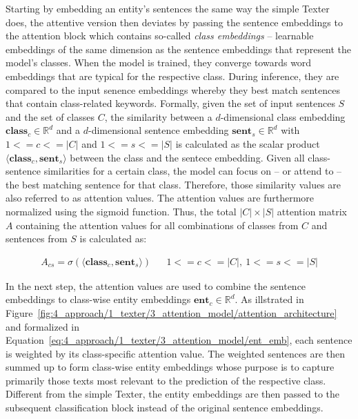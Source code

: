 Starting by embedding an entity's sentences the same way the simple Texter does, the attentive version then deviates by passing the sentence embeddings to the attention block which contains so-called \emph{class embeddings} -- learnable embeddings of the same dimension as the sentence embeddings that represent the model's classes. When the model is trained, they converge towards word embeddings that are typical for the respective class. During inference, they are compared to the input senence embeddings whereby they best match sentences that contain class-related keywords. Formally, given the set of input sentences $S$ and the set of classes $C$, the similarity between a $d$-dimensional class embedding $\textbf{class}_c \in \mathbb{R}^d$ and a $d$-dimensional sentence embedding $\textbf{sent}_s \in \mathbb{R}^d$ with $1 <= c <= |C|$ and $1 <= s <= |S|$ is calculated as the scalar product $\langle \textbf{class}_c, \textbf{sent}_s \rangle$ between the class and the sentece embedding. Given all class-sentence similarities for a certain class, the model can focus on -- or attend to -- the best matching sentence for that class. Therefore, those similarity values are also referred to as attention values. The attention values are furthermore normalized using the sigmoid function. Thus, the total $|C| \times |S|$ attention matrix $A$ containing the attention values for all combinations of classes from $C$ and sentences from $S$ is calculated as:

\begin{align}
    A_{cs} = \sigma(\langle \textbf{class}_c , \textbf{sent}_s \rangle) && 1 <= c <= |C|,~1 <= s <= |S|
    \label{eq:4_approach/1_texter/3_attention_model/attention_matrix}
\end{align}

In the next step, the attention values are used to combine the sentence embeddings to class-wise entity embeddings $\textbf{ent}_c \in \mathbb{R}^d$. As illstrated in Figure~\ref{fig:4_approach/1_texter/3_attention_model/attention_architecture} and formalized in Equation~\ref{eq:4_approach/1_texter/3_attention_model/ent_emb}, each sentence is weighted by its class-specific attention value. The weighted sentences are then summed up to form class-wise entity embeddings whose purpose is to capture primarily those texts most relevant to the prediction of the respective class. Different from the simple Texter, the entity embeddings are then passed to the subsequent classification block instead of the original sentence embeddings.

